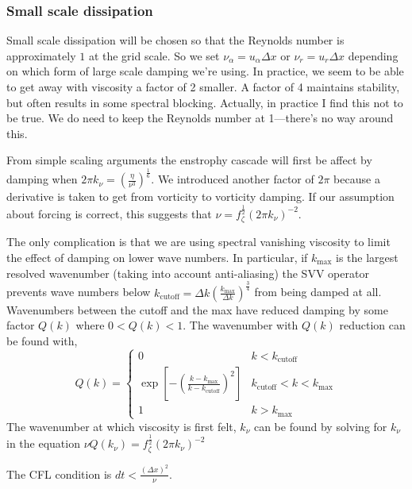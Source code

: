 \documentclass[11pt]{article}
\begin{document}
\subsubsection{Small scale dissipation}

Small scale dissipation will be chosen so that the Reynolds number is approximately $1$ at the grid scale. So we set $\nu_\alpha=u_\alpha \Delta x$ or $\nu_r=u_r \Delta x$ depending on which form of large scale damping we're using. In practice, we seem to be able to get away with viscosity a factor of 2 smaller. A factor of 4 maintains stability, but often results in some spectral blocking. Actually, in practice I find this not to be true. We do need to keep the Reynolds number at 1---there's no way around this.

From simple scaling arguments the enstrophy cascade will first be affect by damping when $ 2 \pi k_\nu=\left( \frac{ \eta}{\nu^3} \right)^{\frac{1}{6}}$. We introduced another factor of $2\pi$ because a derivative is taken to get from vorticity to vorticity damping. If our assumption about forcing is correct, this suggests that $\nu = f_\zeta^\frac{1}{2} (2 \pi k_\nu)^{-2}$.

The only complication is that we are using spectral vanishing viscosity to limit the effect of damping on lower wave numbers. In particular, if $k_{\textrm{max}}$ is the largest resolved wavenumber (taking into account anti-aliasing) the SVV operator prevents wave numbers below $k_{\textrm{cutoff}}=\Delta k \left(\frac{k_{\textrm{max}}}{\Delta k} \right)^{\frac{3}{4}}$ from being damped at all. Wavenumbers between the cutoff and the max have reduced damping by some factor $Q(k)$ where $0<Q(k)<1$. The wavenumber with $Q(k)$ reduction can be found with,
\begin{equation}
Q(k) = 
\begin{cases}
0 & k < k_{\textrm{cutoff}} \\
\exp \left[ - \left( \frac{k-k_{\textrm{max}}}{k-k_{\textrm{cutoff}}} \right)^2 \right] & k_{\textrm{cutoff}} < k < k_{\textrm{max}} \\
1 & k > k_{\textrm{max}}
\end{cases}
\end{equation}
The wavenumber at which viscosity is first felt, $k_\nu$ can be found by solving for $k_\nu$ in the equation $\nu Q(k_\nu) = f_\zeta^\frac{1}{2} (2 \pi k_\nu)^{-2}$

The CFL condition is $dt < \frac{(\Delta x)^2}{\nu}$.
\end{document}
